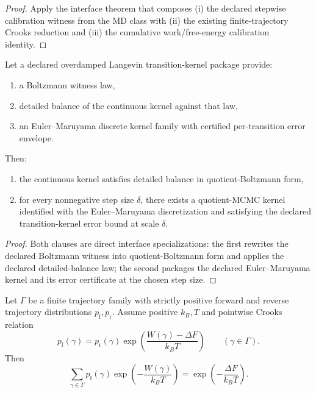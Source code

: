 \begin{proof}
Apply the interface theorem that composes (i) the declared stepwise calibration witness from the MD class with (ii) the existing finite-trajectory Crooks reduction and (iii) the cumulative work/free-energy calibration identity.
\end{proof}

\begin{theorem}\label{thm:langevin-to-mcmc-discretization-interface}
Let a declared overdamped Langevin transition-kernel package provide:
\begin{enumerate}
\item a Boltzmann witness law,
\item detailed balance of the continuous kernel against that law,
\item an Euler--Maruyama discrete kernel family with certified per-transition error envelope.
\end{enumerate}
Then:
\begin{enumerate}
\item the continuous kernel satisfies detailed balance in quotient-Boltzmann form,
\item for every nonnegative step size $\delta$, there exists a quotient-MCMC kernel identified with the Euler--Maruyama discretization and satisfying the declared transition-kernel error bound at scale $\delta$.
\end{enumerate}
\end{theorem}

\begin{proof}
Both clauses are direct interface specializations: the first rewrites the declared Boltzmann witness into quotient-Boltzmann form and applies the declared detailed-balance law; the second packages the declared Euler--Maruyama kernel and its error certificate at the chosen step size.
\end{proof}

\begin{theorem}\label{thm:jarzynski-from-crooks}
Let $\Gamma$ be a finite trajectory family with strictly positive forward and reverse trajectory distributions $p_{\mathrm f},p_{\mathrm r}$. Assume positive $k_B,T$ and pointwise Crooks relation
\[
p_{\mathrm f}(\gamma)
=
p_{\mathrm r}(\gamma)
\exp\!\left(\frac{W(\gamma)-\Delta F}{k_B T}\right)
\qquad (\gamma\in\Gamma).
\]
Then
\[
\sum_{\gamma\in\Gamma}
p_{\mathrm f}(\gamma)
\exp\!\left(-\frac{W(\gamma)}{k_B T}\right)
=
\exp\!\left(-\frac{\Delta F}{k_B T}\right).
\]
\end{theorem}

